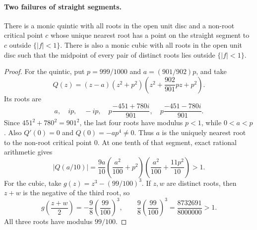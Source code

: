 \documentclass[11pt]{article}
\begin{document}
\paragraph{Two failures of straight segments.}
\begin{proposition}
\label{res:straight-no-go}
There is a monic quintic with all roots in the open unit disc and a non-root
critical point $c$ whose unique nearest root has a point on the straight segment
to $c$ outside $\{|f|<1\}$.  There is also a monic cubic with all roots in the
open unit disc such that the midpoint of every pair of distinct roots lies
outside $\{|f|<1\}$.
\end{proposition}
\begin{proof}
For the quintic, put $p=999/1000$ and $a=(901/902)p$, and take
\[
 Q(z)=(z-a)(z^2+p^2)
       \left(z^2+\frac{902}{901}pz+p^2\right).
\]
Its roots are
\[
 a,\quad ip,\quad-ip,\quad
 p\frac{-451+780i}{901},\quad p\frac{-451-780i}{901}.
\]
Since $451^2+780^2=901^2$, the last four roots have modulus $p<1$,
while $0<a<p$. Also $Q'(0)=0$ and $Q(0)=-ap^4\ne0$. Thus $a$ is
the uniquely nearest root to the non-root critical point $0$.
At one tenth of that segment, exact rational arithmetic gives
\[
 |Q(a/10)|=
 \frac{9a}{10}\left(\frac{a^2}{100}+p^2\right)
 \left(\frac{a^2}{100}+\frac{11p^2}{10}\right)>1.
\]
For the cubic, take $g(z)=z^3-(99/100)^3$. If $z,w$ are distinct roots,
then $z+w$ is the negative of the third root, so
\[
 g\!\left(\frac{z+w}{2}\right)
 =-\frac98\left(\frac{99}{100}\right)^3,
 \qquad \frac98\left(\frac{99}{100}\right)^3
 =\frac{8732691}{8000000}>1.
\]
All three roots have modulus $99/100$.
\end{proof}
\end{document}
